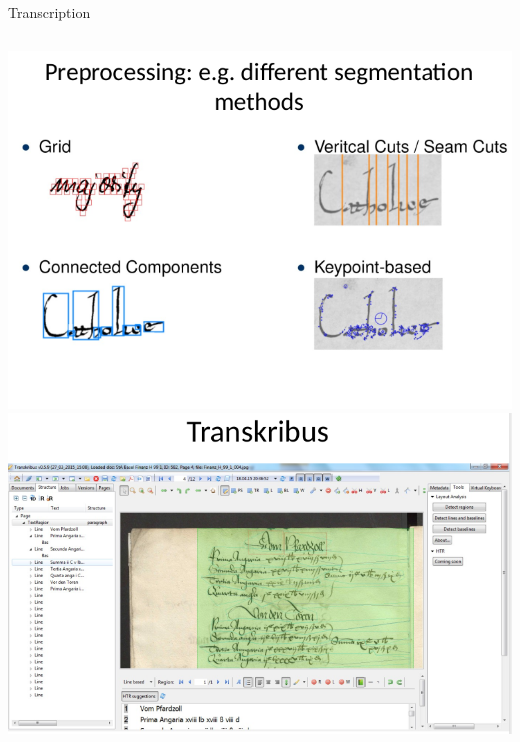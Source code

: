 \begin{frame}{Transcription}
\begin{columns}

\includegraphics[width=\textwidth]{img/ocr3.png}
\includegraphics[width=\textwidth]{img/ocr4-transkribus-app.png}

\end{columns}

\end{frame}

